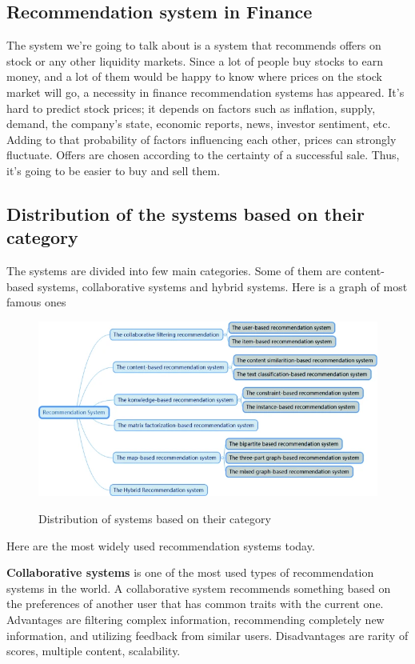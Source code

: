 \documentclass[10pt,twoside,english,a4paper]{article}
\begin{document}
\subsection{Recommendation system in Finance}
\par The system we're going to talk about is a system that recommends offers on stock or any other liquidity markets. Since a lot of people buy stocks to earn money, and a lot of them would be happy to know where prices on the stock market will go, a necessity in finance recommendation systems has appeared. It's hard to predict stock prices; it depends on factors such as inflation, supply, demand, the company's state, economic reports, news, investor sentiment, etc. Adding to that probability of factors influencing each other, prices can strongly fluctuate. Offers are chosen according to the certainty of a successful sale. Thus, it's going to be easier to buy and sell them.\cite{stock_rec}\cite{stock_prices}

\subsection{Distribution of the systems based on their category}
The systems are divided into few main categories. Some of them are content-based systems, collaborative systems and hybrid systems. Here is a graph of most famous ones
\begin{figure}[h]
\centering
\includegraphics[width=1\textwidth]{system_vars}
\caption{Distribution of systems based on their category}\cite{wang2019review}
\label{fig:System categories}
\end{figure}


Here are the most widely used recommendation systems today.
\par \textbf{Collaborative systems} is one of the most used types of recommendation systems in the world. A collaborative system recommends something based on the preferences of another user that has common traits with the current one. Advantages are filtering complex information, recommending completely new information, and utilizing feedback from similar users. Disadvantages are rarity of scores, multiple content, scalability.
\end{document}

